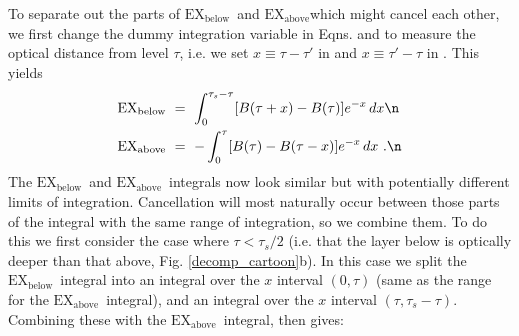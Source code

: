 \documentclass[10pt]{article}
\newcommand{\taus}{\ensuremath{\tau_s}}
\newcommand{\EXbelow}{\ensuremath{\mathrm{EX_{below}}}}
\newcommand{\EXabove}{\ensuremath{\mathrm{EX_{above}}}}
\begin{document}
To separate out the parts of \EXbelow\ and \EXabove which might cancel each other, we first change the dummy integration variable in  Eqns.   and  to measure the optical distance from level $\tau$, i.e. we set
$x \equiv \tau-\tau'$ in  and $x \equiv \tau'-\tau$ in . This yields
\begin{align}	
\EXbelow &\  = \ \int_{0}^{\taus - \tau} [B(\tau+x)-B(\tau)]e^{-x} \, dx \n \\	
\EXabove &\ = \ -\int_{0}^{ \tau} [B(\tau)-B(\tau-x)]e^{-x} \, dx 	\ . \n
\end{align}	
The \EXbelow\ and \EXabove\ integrals now look similar but with potentially different limits of integration. Cancellation will most naturally occur between those parts of the integral with the same range of integration, so we combine them. To do this we first consider the case where $\tau < \taus/2$ (i.e. that the layer below is optically deeper than that above, Fig. \ref{decomp_cartoon}b). In this case we split the \EXbelow\ integral into an integral over the $x$ interval $(0,\tau)$ (same as the range for the \EXabove\ integral), and an integral over the $x$ interval $(\tau,\taus-\tau)$. Combining these with  the \EXabove\ integral,  then gives:
\end{document}
